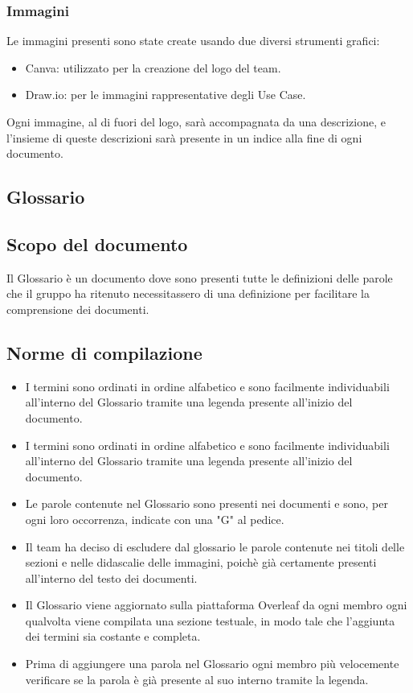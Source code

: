 \documentclass{article}
\begin{document}
\subsubsection{Immagini}
Le immagini presenti sono state create usando due diversi strumenti grafici:
\begin{itemize}
    \item Canva: utilizzato per la creazione del logo del team. 
    \item Draw.io: per le immagini rappresentative degli Use Case.
\end{itemize}
Ogni immagine, al di fuori del logo, sarà accompagnata da una descrizione, e l'insieme di queste descrizioni sarà presente in un indice alla fine di ogni documento. 

\subsection*{Glossario}
\subsection*{Scopo del documento}
Il Glossario è un documento dove sono presenti tutte le definizioni delle parole che il gruppo ha ritenuto necessitassero di una definizione per facilitare la comprensione dei documenti. 
\subsection*{Norme di compilazione}
\begin{itemize}
    \item I termini sono ordinati in ordine alfabetico e sono facilmente individuabili all'interno del Glossario tramite una legenda presente all'inizio del documento.
    \item I termini sono ordinati in ordine alfabetico e sono facilmente individuabili all'interno del Glossario tramite una legenda presente all'inizio del documento.
    \item Le parole contenute nel Glossario sono presenti nei documenti e sono, per ogni loro occorrenza, indicate con una "G" al pedice.
    \item Il team ha deciso di escludere dal glossario le parole contenute nei titoli delle sezioni e nelle didascalie delle immagini, poichè già certamente presenti all'interno del testo dei documenti. 
    \item Il Glossario viene aggiornato sulla piattaforma Overleaf da ogni membro ogni qualvolta viene compilata una sezione testuale, in modo tale che l'aggiunta dei termini sia costante e completa. 
    \item Prima di aggiungere una parola nel Glossario ogni membro più velocemente verificare se la parola è già presente al suo interno tramite la legenda.
\end{itemize}  
\end{document}
